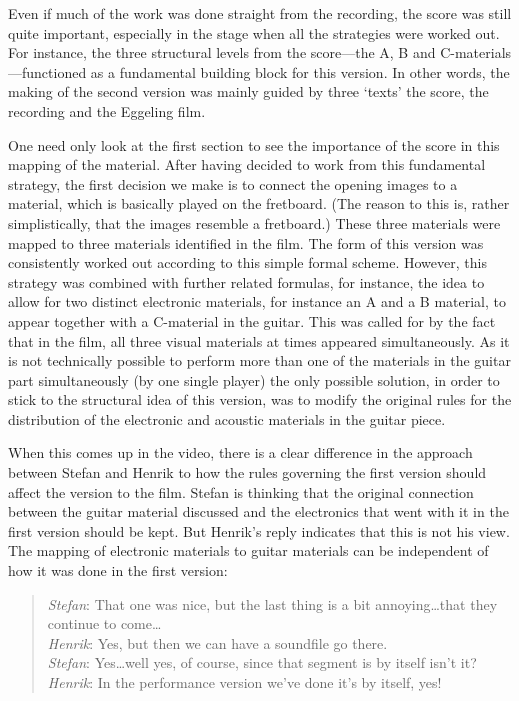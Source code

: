 Even if much of the work was done straight from the recording, the
score was still quite important, especially in the stage when all the
strategies were worked out. For instance, the three structural levels
from the score---the A, B and C-materials---functioned as a
fundamental building block for this version. In other words, the
making of the second version was mainly guided by three `texts' the
score, the recording and the Eggeling film.
 
One need only look at the first section to see the importance of the
score in this mapping of the material. After having decided to work
from this fundamental strategy, the first decision we make is to
connect the opening images to a material, which is basically played on
the fretboard. (The reason to this is, rather simplistically, that the
images resemble a fretboard.) These three materials were mapped to
three materials identified in the film. The form of this version was
consistently worked out according to this simple formal
scheme. However, this strategy was combined with further related
formulas, for instance, the idea to allow for two distinct electronic
materials, for instance an A and a B material, to appear together with
a C-material in the guitar. This was called for by the fact that in
the film, all three visual materials at times appeared
simultaneously. As it is not technically possible to perform more than
one of the materials in the guitar part simultaneously (by one single
player) the only possible solution, in order to stick to the
structural idea of this version, was to modify the original rules for
the distribution of the electronic and acoustic materials in the
guitar piece.
 
When this comes up in the video, there is a clear difference in the
approach between Stefan and Henrik to how the rules governing the
first version should affect the version to the film. Stefan is
thinking that the original connection between the guitar material
discussed and the electronics that went with it in the first version
should be kept. But Henrik's reply indicates that this is not his
view. The mapping of electronic materials to guitar materials can be
independent of how it was done in the first version:
 
\begin{quote}
  \emph{Stefan}: That one was nice, but the last thing is a bit
  annoying\ldots that they continue to come\ldots\\
  \emph{Henrik}: Yes, but then we
  can have a soundfile go there.\\
  \emph{Stefan}: Yes\ldots well yes, of course,
  since that segment is by itself isn't it?\\
  \emph{Henrik}: In the performance version we've done it's by itself, yes!
\end{quote}

